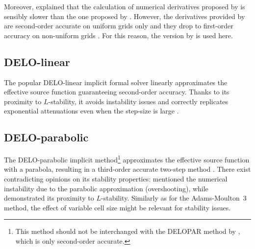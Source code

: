 \documentclass[iop,numberedappendix,twocolappendix,twocolumn]{emulateapj}
\begin{document}
Moreover, \citet{ibgui2013} explained that the calculation of numerical derivatives proposed by
\citet{steffen1990} is sensibly slower than the one proposed by \citet{fritsch1984}.
However, the derivatives provided by \citet{fritsch1984} are second-order accurate on uniform
grids only and they drop to first-order accuracy on non-uniform grids \citep[see][]{janett2018a}.
For this reason, the version by \citet{steffen1990} is used here.
%
% 
%
\subsection{DELO-linear}\label{subsec:3.2b}
%
The popular DELO-linear implicit formal solver
linearly approximates the effective source function \citep[see][]{rees+al1989} guaranteeing second-order accuracy.
Thanks to its proximity to $L$-stability, it avoids instability issues and
correctly replicates exponential attenuations even when the step-size is large \citep{janett2018a}.
%
\subsection{DELO-parabolic}\label{subsec:3.3}
%
The DELO-parabolic implicit method\footnote{This method should not be interchanged with the DELOPAR method by \citet{trujillo_bueno2003},
which is only second-order accurate.} approximates the effective source function with a parabola,
resulting in a third-order accurate two-step method \citep{janett2017a}.
There exist contradicting opinions on its stability properties:
\citet{murphy1990} mentioned the numerical instability due to the parabolic approximation (overshooting),
while \citet{janett2018a} demonstrated its proximity to $L$-stability.
Similarly as for the Adams-Moulton~3 method, the effect of variable cell size might be relevant for stability issues.
%
\end{document}
